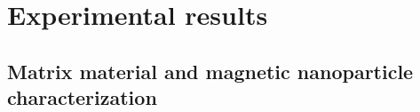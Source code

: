  

% 



\section{Experimental results}
\label{sec:exp_res}

\subsection{Matrix material and magnetic nanoparticle characterization}
\label{subsec:mat_mag_char_res}

